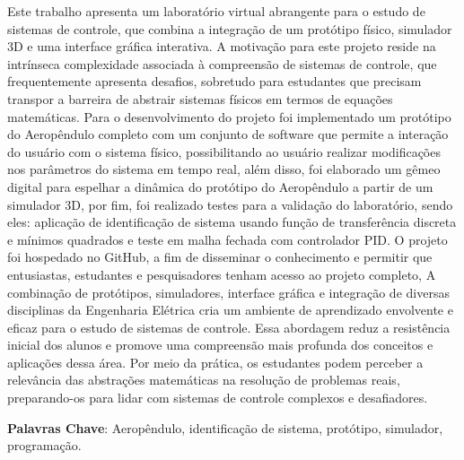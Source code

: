 
\begin{resumo}
	
Este trabalho apresenta um laboratório virtual abrangente para o estudo de sistemas de controle, que combina a integração de um protótipo físico, simulador 3D e uma interface gráfica interativa. A motivação para este projeto reside na intrínseca complexidade associada à compreensão de sistemas de controle, que frequentemente apresenta desafios, sobretudo para estudantes que precisam transpor a barreira de abstrair sistemas físicos em termos de equações matemáticas. Para o desenvolvimento do projeto foi implementado um protótipo do Aeropêndulo completo com um conjunto de software que permite a interação do usuário com o sistema físico, possibilitando ao usuário realizar modificações nos parâmetros do sistema em tempo real, além disso, foi elaborado um gêmeo digital para espelhar a dinâmica do protótipo do Aeropêndulo a partir de um simulador 3D, por fim, foi realizado testes para a validação do laboratório, sendo eles: aplicação de identificação de sistema usando função de transferência discreta e mínimos quadrados e teste em malha fechada com controlador PID. O projeto foi hospedado no GitHub, a fim de disseminar o conhecimento e permitir que entusiastas, estudantes e pesquisadores tenham acesso ao projeto completo, A combinação de protótipos, simuladores, interface gráfica e integração de diversas disciplinas da Engenharia Elétrica cria um ambiente de aprendizado envolvente e eficaz para o estudo de sistemas de controle. Essa abordagem reduz a resistência inicial dos alunos e promove uma compreensão mais profunda dos conceitos e aplicações dessa área. Por meio da prática, os estudantes podem perceber a relevância das abstrações matemáticas na resolução de problemas reais, preparando-os para lidar com sistemas de controle complexos e desafiadores.


\textbf{Palavras Chave}: Aeropêndulo, identificação de sistema, protótipo, simulador, programação.

\end{resumo}


